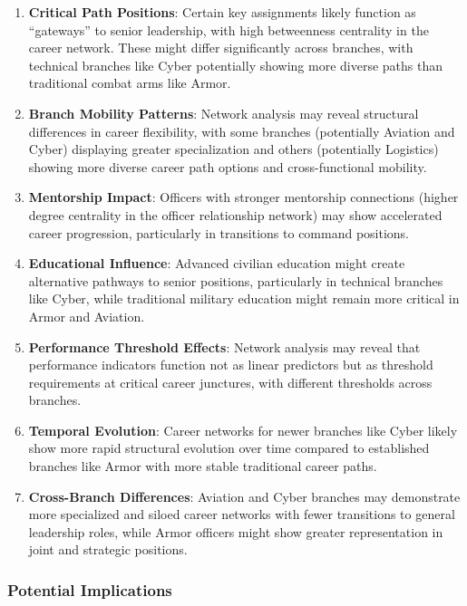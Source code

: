 \documentclass[
  letterpaper,
  DIV=11,
  numbers=noendperiod]{scrartcl}
\begin{document}
\begin{enumerate}
\def\labelenumi{\arabic{enumi}.}
\item
  \textbf{Critical Path Positions}: Certain key assignments likely
  function as ``gateways'' to senior leadership, with high betweenness
  centrality in the career network. These might differ significantly
  across branches, with technical branches like Cyber potentially
  showing more diverse paths than traditional combat arms like Armor.
\item
  \textbf{Branch Mobility Patterns}: Network analysis may reveal
  structural differences in career flexibility, with some branches
  (potentially Aviation and Cyber) displaying greater specialization and
  others (potentially Logistics) showing more diverse career path
  options and cross-functional mobility.
\item
  \textbf{Mentorship Impact}: Officers with stronger mentorship
  connections (higher degree centrality in the officer relationship
  network) may show accelerated career progression, particularly in
  transitions to command positions.
\item
  \textbf{Educational Influence}: Advanced civilian education might
  create alternative pathways to senior positions, particularly in
  technical branches like Cyber, while traditional military education
  might remain more critical in Armor and Aviation.
\item
  \textbf{Performance Threshold Effects}: Network analysis may reveal
  that performance indicators function not as linear predictors but as
  threshold requirements at critical career junctures, with different
  thresholds across branches.
\item
  \textbf{Temporal Evolution}: Career networks for newer branches like
  Cyber likely show more rapid structural evolution over time compared
  to established branches like Armor with more stable traditional career
  paths.
\item
  \textbf{Cross-Branch Differences}: Aviation and Cyber branches may
  demonstrate more specialized and siloed career networks with fewer
  transitions to general leadership roles, while Armor officers might
  show greater representation in joint and strategic positions.
\end{enumerate}

\subsubsection{Potential Implications}\label{potential-implications}
\end{document}
